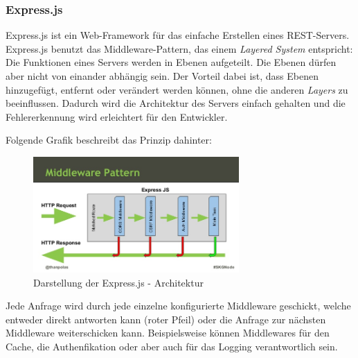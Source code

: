 \clearpage
\subsubsection{Express.js}
Express.js ist ein Web-Framework für das einfache Erstellen eines REST-Servers. Express.js benutzt das Middleware-Pattern, das einem \textit{Layered System} entspricht: Die Funktionen eines Servers werden in Ebenen aufgeteilt. Die Ebenen dürfen aber nicht von einander abhängig sein. Der Vorteil dabei ist, dass Ebenen hinzugefügt, entfernt oder verändert werden
können, ohne die anderen \textit{Layers} zu beeinflussen. Dadurch wird die Architektur des Servers einfach gehalten und die Fehlererkennung wird erleichtert für den Entwickler.

Folgende Grafik beschreibt das Prinzip dahinter:
\begin{figure}[ht]
    \centering
	\includegraphics[width=0.7\textwidth]{images/express}
	\caption{Darstellung der Express.js - Architektur \cite{express}}
\end{figure}

Jede Anfrage wird durch jede einzelne konfigurierte Middleware geschickt, welche entweder direkt antworten kann (roter Pfeil) oder die Anfrage zur nächsten Middleware weiterschicken kann. Beispielsweise können Middlewares für den Cache, die Authenfikation oder aber auch für das Logging verantwortlich sein.
